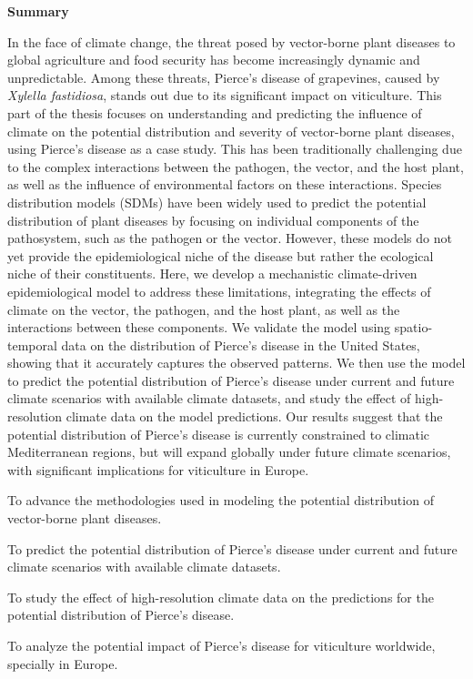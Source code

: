 \thispagestyle{empty}

\begin{center}
    \textbf{\Large Summary}
\end{center}

In the face of climate change, the threat posed by vector-borne plant diseases
to global agriculture and food security has become increasingly dynamic and
unpredictable. Among these threats, Pierce's disease of grapevines, caused by
\textit{Xylella fastidiosa}, stands out due to its significant impact on
viticulture. This part of the thesis focuses on understanding and predicting
the influence of climate on the potential distribution and severity of
vector-borne plant diseases, using Pierce's disease as a case study. This has
been traditionally challenging due to the complex interactions between the
pathogen, the vector, and the host plant, as well as the influence of
environmental factors on these interactions. Species distribution models (SDMs)
have been widely used to predict the potential distribution of plant
diseases by focusing on individual components of the pathosystem, such as the
pathogen or the vector. However, these models do not yet provide the
epidemiological niche of the disease but rather the ecological niche of their
constituents. Here, we develop a mechanistic climate-driven
epidemiological model to address these limitations, integrating the effects of
climate on the vector, the pathogen, and the host plant, as well as the
interactions between these components. We validate the model using
spatio-temporal data on the distribution of Pierce's disease in the United
States, showing that it accurately captures the observed patterns. We then use
the model to predict the potential distribution of Pierce's disease under
current and future climate scenarios with available climate datasets, and
study the effect of high-resolution climate data on the model predictions. Our
results suggest that the potential distribution of Pierce's disease is
currently constrained to climatic Mediterranean regions, but  will expand
globally under future climate scenarios, with significant implications
for viticulture in Europe.

\vspace{1cm}

\begin{objectiveslist}
    \item To advance the methodologies used in modeling the potential
    distribution of vector-borne plant diseases.

    \item To predict the potential distribution of Pierce's disease under
    current and future climate scenarios with available climate datasets.

    \item To study the effect of high-resolution climate data on the
    predictions for the potential distribution of Pierce's disease.

    \item To analyze the potential impact of Pierce's disease for viticulture
    worldwide, specially in Europe.
\end{objectiveslist}

